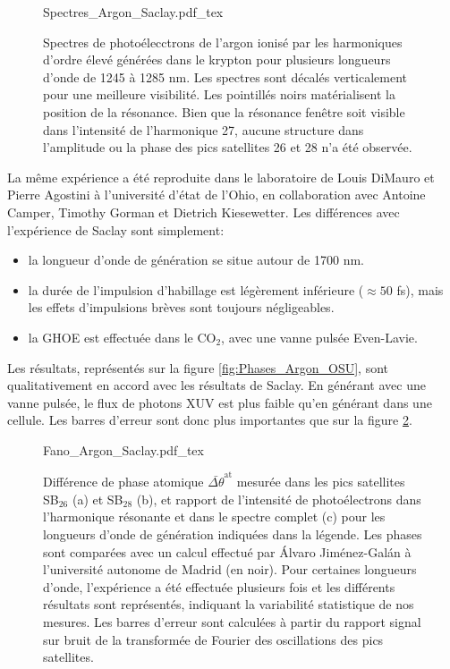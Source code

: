 \begin{figure}
\centering
\def\svgwidth{1\textwidth}
{Spectres_Argon_Saclay.pdf_tex}
\caption{Spectres de photoélecctrons de l'argon ionisé par les harmoniques d'ordre élevé générées dans le krypton pour plusieurs longueurs d'onde de 1245 à 1285 nm. Les spectres sont décalés verticalement pour une meilleure visibilité. Les pointillés noirs matérialisent la position de la résonance. Bien que la résonance fenêtre soit visible dans l'intensité de l'harmonique 27, aucune structure dans l'amplitude ou la phase des pics satellites 26 et 28 n'a été observée.}
\label{fig:Spectres_Argon_Saclay}
\end{figure}

La même expérience a été reproduite dans le laboratoire de Louis DiMauro et Pierre Agostini à l'université d'état de l'Ohio, en collaboration avec Antoine Camper, Timothy Gorman et Dietrich Kiesewetter. Les différences avec l'expérience de Saclay sont simplement:
\begin{itemize}
\item la longueur d'onde de génération se situe autour de 1700 nm.
\item la durée de l'impulsion d'habillage est légèrement inférieure ($\approx 50$ fs), mais les effets d'impulsions brèves sont toujours négligeables.
\item la GHOE est effectuée dans le CO$_2$, avec une vanne pulsée Even-Lavie.
\end{itemize}
Les résultats, représentés sur la figure \ref{fig:Phases_Argon_OSU}, sont qualitativement en accord avec les résultats de Saclay. En générant avec une vanne pulsée, le flux de photons XUV est plus faible qu'en générant dans une cellule. Les barres d'erreur sont donc plus importantes que sur la figure \ref{fig:Phases_Argon_Saclay}.


\begin{figure}
\centering
\def\svgwidth{1\textwidth}
{Fano_Argon_Saclay.pdf_tex}
\caption{Différence de phase atomique $\bar{\Delta \theta}^{\text{at}}$ mesurée dans les pics satellites SB$_{26}$ (a) et SB$_{28}$ (b), et rapport de l'intensité de photoélectrons dans l'harmonique résonante et dans le spectre complet (c) pour les longueurs d'onde de génération indiquées dans la légende. Les phases sont comparées avec un calcul effectué par \'{A}lvaro Jiménez-Gal\'{a}n à l'université autonome de Madrid (en noir). Pour certaines longueurs d'onde, l'expérience a été effectuée plusieurs fois et les différents résultats sont représentés, indiquant la variabilité statistique de nos mesures. Les barres d'erreur sont calculées à partir du rapport signal sur bruit de la transformée de Fourier des oscillations des pics satellites.}
\label{fig:Phases_Argon_Saclay}
\end{figure}

